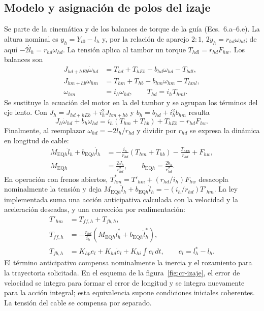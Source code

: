 \documentclass[a4paper,10pt,onecolumn,journal]{ieeeconf}
\numberwithin{equation}{section}
\newcommand{\EQh}{\mathrm{EQ}h}
\begin{document}
	
	\subsection{Modelo y asignación de polos del izaje}
	Se parte de la cinemática y de los balances de torque de la guía (Ecs.~6.a--6.e). La altura nominal es $y_h=Y_{t0}-l_h$ y, por la relación de aparejo $2{:}1$, $2\dot y_h=r_{hd}\omega_{hd}$; de aquí $-2\dot l_h=r_{hd}\omega_{hd}$. La tensión aplica al tambor un torque $T_{hdl}=r_{hd}F_{hw}$. Los balances son
	\begin{align}
		J_{hd+hEb}\dot\omega_{hd}&=T_{hd}+T_{hEb}-b_{hd}\omega_{hd}-T_{hdl},\\
		J_{hm+hb}\dot\omega_{hm}&=T_{hm}+T_{hb}-b_{hm}\omega_{hm}-T_{hml},\\
		\omega_{hm}&=i_h\omega_{hd},\qquad T_{hd}=i_hT_{hml}.
	\end{align}
	Se sustituye la ecuación del motor en la del tambor y se agrupan los términos del eje lento. Con $J_h=J_{hd+hEb}+i_h^2J_{hm+hb}$ y $b_h=b_{hd}+i_h^2b_{hm}$ resulta
	\begin{equation}
		J_h\dot\omega_{hd}+b_h\omega_{hd}
		=i_h(T_{hm}+T_{hb})+T_{hEb}-r_{hd}F_{hw}.
	\end{equation}
	Finalmente, al reemplazar $\omega_{hd}=-2\dot l_h/r_{hd}$ y dividir por $r_{hd}$ se expresa la dinámica en longitud de cable:
	\begin{align}
		M_{\EQh}\ddot l_h+b_{\EQh}\dot l_h
		&=-\frac{i_h}{r_{hd}}(T_{hm}+T_{hb})
		-\frac{T_{hEb}}{r_{hd}}+F_{hw},\\
		M_{\EQh}&=\frac{2J_h}{r_{hd}^2},\qquad
		b_{\EQh}=\frac{2b_h}{r_{hd}^2}.
	\end{align}
En operación con frenos abiertos, $T_{hm}^*=T'_{hm}+(r_{hd}/i_h)F_{hw}$ desacopla nominalmente la tensión y deja $M_{\EQh}\ddot l_h+b_{\EQh}\dot l_h=-(i_h/r_{hd})T'_{hm}$. La ley implementada suma una acción anticipativa calculada con la velocidad y la aceleración deseadas, y una corrección por realimentación:
\begin{align}
T'_{hm}&=T_{ff,h}+T_{fb,h},\\
T_{ff,h}&=-\frac{r_{hd}}{i_h}\left(M_{\EQh}\ddot l_h^*+b_{\EQh}\dot l_h^*\right),\\
T_{fb,h}&=K_{hp}e_l+K_{hd}\dot e_l+K_{hi}\int e_l\,dt,\qquad e_l=l_h^*-l_h.
\end{align}
El término anticipativo compensa nominalmente la inercia y el rozamiento para la trayectoria solicitada. En el esquema de la figura~\ref{fig:cr-izaje}, el error de velocidad se integra para formar el error de longitud y se integra nuevamente para la acción integral; esta equivalencia supone condiciones iniciales coherentes. La tensión del cable se compensa por separado.
\end{document}
